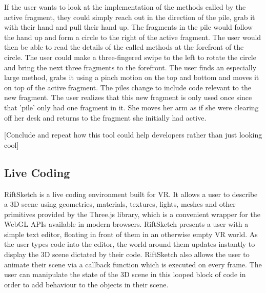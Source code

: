 \documentclass{acm_proc_article-sp}
\begin{document}
    
 If the user wants to look at the implementation of the methods called by the active fragment, they could simply reach out in the direction of the pile, grab it with their hand and pull their hand up. The fragments in the pile would follow the hand up and form a circle to the right of the active fragment. The user would then be able to read the details of the called methods at the forefront of the circle. The user could make a three-fingered swipe to the left to rotate the circle and bring the next three fragments to the forefront.  The user finds an especially large method, grabs it using a pinch motion on the top and bottom and moves it on top of the active fragment. The piles change to include code relevant to the new fragment.  The user realizes that this new fragment is only used once since that 'pile' only had one  fragment in it. She moves her arm as if she were clearing off her desk and returns to the fragment she initially had active.
    
    


[Conclude and repeat how this tool could help developers rather than just looking cool]

\subsection{Live Coding}
RiftSketch is a live coding environment built for VR. It allows a user to describe a 3D scene using geometries, materials, textures, lights, meshes and other primitives provided by the Three.js library, which is a convenient wrapper for the WebGL APIs available in modern browsers. RiftSketch presents a user with a simple text editor, floating in front of them in an otherwise empty VR world. As the user types code into the editor, the world around them updates instantly to display the 3D scene dictated by their code. RiftSketch also allows the user to animate their scene via a callback function which is executed on every frame. The user can manipulate the state of the 3D scene in this looped block of code in order to add behaviour to the objects in their scene.
\end{document}
